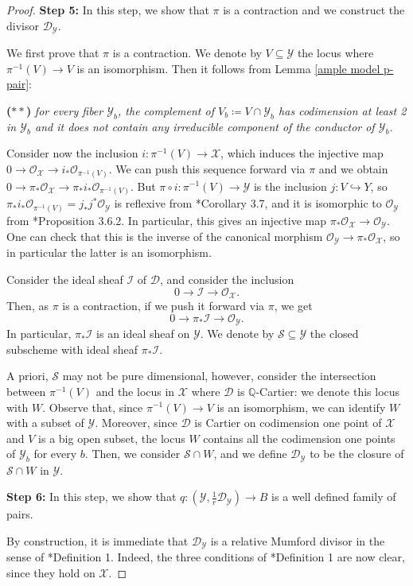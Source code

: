\documentclass{amsart}
\newcommand{\bQ}{\mathbb{Q}}
\newcommand{\cD}{\mathcal{D}}
\newcommand{\cI}{\mathcal{I}}
\newcommand{\cO}{\mathcal{O}}
\newcommand{\cS}{\mathcal{S}}
\newcommand{\cX}{\mathcal{X}}
\newcommand{\cY}{\mathcal{Y}}
\theoremstyle{definition}
\newcommand{\rar}{\rightarrow}
\begin{document}
\begin{proof}
{\bf Step 5:} In this step, we show that $\pi$ is a contraction and we construct the divisor $\cD_\cY$.

We first prove that $\pi$ is a contraction. We denote by $V\subseteq \cY$ the locus where $\pi^{-1}(V)\to V$ is an isomorphism. Then
it follows from Lemma \ref{ample model p-pair}:
\begin{center}
    {\bf ($\ast \ast$)} {\it for every fiber $\cY_b$, the complement of $V_b \coloneqq V \cap \cY_b$ has codimension at least 2 in $\cY_b$ and it does not contain any irreducible component of the conductor of $\cY_b$.}
\end{center}
Consider now the inclusion $i \colon \pi^{-1}(V)\to \cX$, which induces the injective map $0\to \cO_\cX \to i_*\cO_{\pi^{-1}(V)}$. We can push this sequence forward via $\pi$ and we obtain $0\to \pi_*\cO_\cX \to \pi_*i_*\cO_{\pi^{-1}(V)}$. But $\pi\circ i  \colon \pi^{-1}(V)\to \cY$ is the inclusion $j \colon  V\hookrightarrow Y$, so $\pi_*i_*\cO_{\pi^{-1}(V)} = j_*j^*\cO_\cY$ is reflexive from \cite{HK04}*{Corollary 3.7}, and it is isomorphic to $\cO_{\cY}$ from \cite{HK04}*{Proposition 3.6.2}. In particular, this gives an injective map $\pi_*\cO_\cX\to \cO_\cY$. One can check that this is the inverse of the canonical morphism $\cO_\cY\to \pi_*\cO_\cX$, so in particular the latter is an isomorphism.

Consider the ideal sheaf $\cI$ of $\cD$, and consider the inclusion
\[
0\to \cI \to \cO_\cX.
\]
Then, as $\pi$ is a contraction, if we push it forward via $\pi$, we get
\[0\to \pi_*\cI \to \cO_\cY.
\]
In particular, $\pi_* \cI$ is an ideal sheaf on $\cY$.
We denote by $\cS\subseteq \cY$ the closed subscheme with ideal sheaf $\pi_*\cI$.

A priori, $\cS$ may not be pure dimensional, however, consider the intersection between $\pi^{-1}(V)$ and the locus in $\cX$ where $\cD$ is $\bQ$-Cartier: we denote this locus with $W$.
Observe that, since $\pi^{-1}(V)\to V$ is an isomorphism, we can identify $W$ with a subset of $\cY$.
Moreover, since $\cD$ is Cartier on codimension one point of $\cX$ and $V$ is a big open subset, the locus $W$ contains all the codimension one points of $\cY_b$ for every $b$.
Then, we consider $\cS \cap W$, and we define $\cD_\cY$ to be the closure of $\cS \cap W$ in $\cY$.


{\bf Step 6:} In this step, we show that $q \colon (\cY,\frac{1}{r}\cD_\cY) \rar B$ is a well defined family of pairs.

By construction, it is immediate that $\cD_\cY$ is a relative Mumford divisor in the sense of \cite{kol19s}*{Definition 1}. Indeed, the three conditions of \cite{kol19s}*{Definition 1} are now clear, since they hold on $\cX$.


\end{proof}
\end{document}
